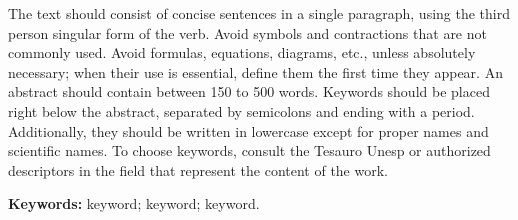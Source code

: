 	
	
	\begin{resumo}[Abstract] %
		
		The text should consist of concise sentences in a single paragraph, using the third person singular form of the verb. Avoid symbols and contractions that are not commonly used. Avoid formulas, equations, diagrams, etc., unless absolutely necessary; when their use is essential, define them the first time they appear. An abstract should contain between 150 to 500 words. Keywords should be placed right below the abstract, separated by semicolons and ending with a period. Additionally, they should be written in lowercase except for proper names and scientific names. To choose keywords, consult the Tesauro Unesp or authorized descriptors in the field that represent the content of the work.
		
		\vspace*{0.5cm}
		
		\noindent\textbf{{Keywords: }} keyword; keyword; keyword.
		
	\end{resumo}
	
	

